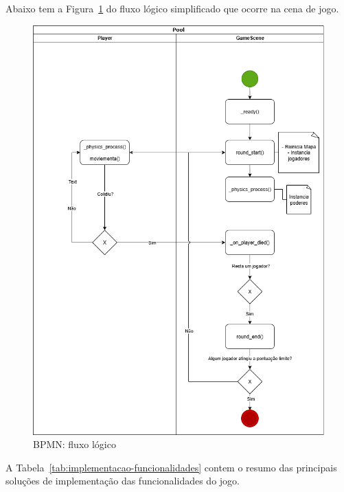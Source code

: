 Abaixo tem a Figura~\ref{fig:bpmn} do fluxo lógico simplificado que ocorre na cena de jogo.

\begin{figure}[htbp]
    \centering
    \caption{BPMN: fluxo lógico}
    \label{fig:bpmn}
    \includegraphics[width=1\textwidth]{figuras/BPMN_tcc.png}
\end{figure}

A Tabela~\ref{tab:implementacao-funcionalidades} contem o resumo das principais soluções de implementação das funcionalidades do jogo.

